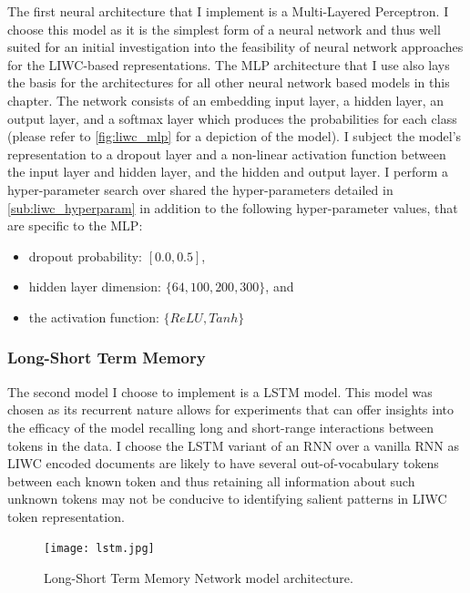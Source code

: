 The first neural architecture that I implement is a Multi-Layered Perceptron. I choose this model as it is the simplest form of a neural network and thus well suited for an initial investigation into the feasibility of neural network approaches for the LIWC-based representations. The MLP architecture that I use also lays the basis for the architectures for all other neural network based models in this chapter. The network consists of an embedding input layer, a hidden layer, an output layer, and a softmax layer which produces the probabilities for each class (please refer to \cref{fig:liwc_mlp} for a depiction of the model). I subject the model's representation to a dropout layer and a non-linear activation function between the input layer and hidden layer, and the hidden and output layer.
I perform a hyper-parameter search over shared the hyper-parameters detailed in \cref{sub:liwc_hyperparam} in addition to the following hyper-parameter values, that are specific to the MLP:

\begin{itemize}
  \item dropout probability: $[0.0, 0.5]$,
  \item hidden layer dimension: $\{64, 100, 200, 300\}$, and
  \item the activation function: $\{ReLU, Tanh\}$
\end{itemize}

\subsubsection{Long-Short Term Memory}

The second model I choose to implement is a LSTM model. This model was chosen as its recurrent nature allows for experiments that can offer insights into the efficacy of the model recalling long and short-range interactions between tokens in the data. I choose the LSTM variant of an RNN over a vanilla RNN as LIWC encoded documents are likely to have several out-of-vocabulary tokens between each known token and thus retaining all information about such unknown tokens may not be conducive to identifying salient patterns in LIWC token representation.

\begin{figure}
  \centering
  \texttt{[image: lstm.jpg]}
  \caption{Long-Short Term Memory Network model architecture.}
  \label{fig:liwc_lstm}
\end{figure}

